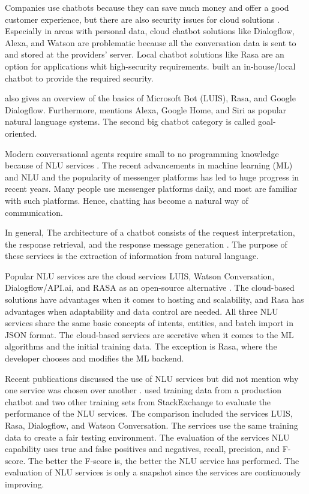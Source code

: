 Companies use chatbots because they can save much money and offer a good customer experience, but there are also security issues for cloud solutions \cite{singhbuilding}.
Especially in areas with personal data, cloud chatbot solutions like Dialogflow, Alexa, and Watson are problematic because all the conversation data is sent to and stored at the providers' server.
Local chatbot solutions like Rasa are an option for applications whit high-security requirements.
\citet{singhbuilding} built an in-house/local chatbot to provide the required security.

\citet{singhbuilding} also gives an overview of the basics of Microsoft Bot (LUIS), Rasa, and Google Dialogflow.
Furthermore, \citet{singhbuilding} mentions Alexa, Google Home, and Siri as popular natural language systems. 
The second big chatbot category is called goal-oriented.


Modern conversational agents require small to no programming knowledge because of NLU services \cite{braunEvaluatingNLU}. 
The recent advancements in machine learning (ML) and NLU and the popularity of messenger platforms has led to huge progress in recent years. 
Many people use messenger platforms daily, and most are familiar with such platforms.
Hence, chatting has become a natural way of communication.

In general, The architecture of a chatbot consists of the request interpretation, the response retrieval, and the response message generation \cite{braunEvaluatingNLU}.
The purpose of these services is the extraction of information from natural language. 

Popular NLU services are the cloud services LUIS, Watson Conversation, Dialogflow/API.ai, and RASA as an open-source alternative \cite{braunEvaluatingNLU}. 
The cloud-based solutions have advantages when it comes to hosting and scalability, and Rasa has advantages when adaptability and data control are needed. 
All three NLU services share the same basic concepts of intents, entities, and batch import in JSON format.
The cloud-based services are secretive when it comes to the ML algorithms and the initial training data. 
The exception is Rasa, where the developer chooses and modifies the ML backend. 

Recent publications discussed the use of NLU services but did not mention why one service was chosen over another \cite{braunEvaluatingNLU}.
\citet{braunEvaluatingNLU} used training data from a production chatbot and two other training sets from StackExchange to evaluate the performance of the NLU services.
The comparison included the services LUIS, Rasa, Dialogflow, and Watson Conversation.
The services use the same training data to create a fair testing environment. 
The evaluation of the services NLU capability uses true and false positives and negatives, recall, precision, and F-score. 
The better the F-score is, the better the NLU service has performed. 
The evaluation of NLU services is only a snapshot since the services are continuously improving. 

